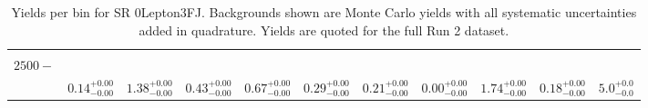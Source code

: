 \begin{table}[!htbp]
\begin{tabular}{c|c|c|c|c|c|c|c|c|c||c}
    \hline
    \pbox{20cm}{ ~ \\$2500-$\\ } & $0.14  ^{+0.00}_{-0.00}$ & $1.38  ^{+0.00}_{-0.00}$ & $0.43  ^{+0.00}_{-0.00}$ & $0.67  ^{+0.00}_{-0.00}$ & $0.29  ^{+0.00}_{-0.00}$ & $0.21  ^{+0.00}_{-0.00}$ & $0.00  ^{+0.00}_{-0.00}$ & $1.74  ^{+0.00}_{-0.00}$ & $0.18  ^{+0.00}_{-0.00}$ & $5.0  ^{+0.0}_{-0.0}$\\
\end{tabular}
    \caption{Yields per bin for SR 0Lepton3FJ. Backgrounds shown are Monte Carlo yields with all systematic uncertainties added in quadrature. Yields are quoted for the full Run 2 dataset.}
    \label{tab:0Lepton3FJ$binssyst}
\end{table}
